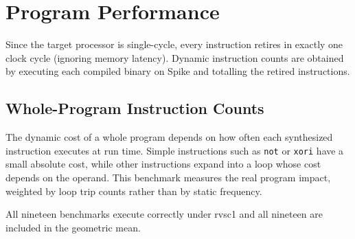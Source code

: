 \section{Program Performance}

Since the target processor is single-cycle, every instruction retires in exactly one clock cycle
(ignoring memory latency). Dynamic instruction counts are obtained by executing each compiled binary
on Spike and totalling the retired instructions.

\subsection{Whole-Program Instruction Counts} \label{sec:embench-perf}

The dynamic cost of a whole program depends on how often each synthesized instruction executes at run
time. Simple instructions such as \texttt{not} or \texttt{xori} have a small absolute cost, while
other instructions expand into a loop whose cost depends on the operand. This benchmark measures the
real program impact, weighted by loop trip counts rather than by static frequency.

All nineteen benchmarks execute correctly under rvsc1 and all nineteen are included in the geometric mean.


